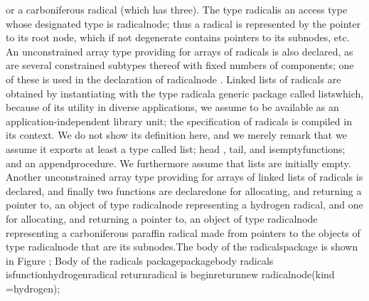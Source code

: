 or a carboniferous radical (which has three). The type %
\tyxffmxmono[]radical\tyxffmxendmono[] is an access type whose designated
type is \tyxffmxmono[]radical\Symuns[]node\tyxffmxendmono[]; thus
a radical is represented by the pointer to its root node, which if
not degenerate contains pointers to its subnodes, etc. An unconstrained
array type providing for arrays of radicals is also declared, as are
several constrained subtypes thereof with fixed numbers of components;
one of these is used in the declaration of \tyxffmxmono[]radical\Symuns[]node%
\tyxffmxendmono[]. Linked lists of radicals are obtained by instantiating
with the type \tyxffmxmono[]radical\tyxffmxendmono[] a generic package
called \tyxffmxmono[]lists\tyxffmxendmono[] which, because of its
utility in diverse applications, we assume to be available as an application-independent
library unit; the specification of \tyxffmxmono[]radicals%
\tyxffmxendmono[] is compiled in its context. We do not show its definition
here, and we merely remark that we assume it exports at least a type
called \tyxffmxmono[]list\tyxffmxendmono[]; \tyxffmxmono[]head%
\tyxffmxendmono[], \tyxffmxmono[]tail\tyxffmxendmono[], and %
\tyxffmxmono[]is\Symuns[]empty\tyxffmxendmono[] functions; and an
\tyxffmxmono[]append\tyxffmxendmono[] procedure. We furthermore assume
that lists are initially empty. Another unconstrained array type providing
for arrays of linked lists of radicals is declared, and finally two
functions are declared\EmDash[]one for allocating, and returning a
pointer to, an object of type \tyxffmxmono[]radical\Symuns[]node%
\tyxffmxendmono[] representing a hydrogen radical, and one for allocating,
and returning a pointer to, an object of type \tyxffmxmono[]radical\Symuns[]node%
\tyxffmxendmono[] representing a carboniferous paraffin radical made
from pointers to the objects of type \tyxffmxmono[]radical\Symuns[]node%
\tyxffmxendmono[] that are its subnodes.\Endpara[]
\Para[]The body of the \tyxffmxmono[]radicals\tyxffmxendmono[] package
is shown in Figure ;
\Parbox[]
Body of the \tyxffmxmono[]radicals%
\tyxffmxendmono[] package\FgEndcap[]
\Comp[]\tyxtstxbf[]package\tyxtstxendbf[] \tyxtstxbf[]body%
\tyxtstxendbf[] radicals \tyxtstxbf[]is\tyxtstxendbf[]
   \tyxtstxbf[]function\tyxtstxendbf[] hydrogen\Symuns[]radical %
\tyxtstxbf[]return\tyxtstxendbf[] radical \tyxtstxbf[]is%
\tyxtstxendbf[]
   \tyxtstxbf[]begin\tyxtstxendbf[]
      \tyxtstxbf[]return\tyxtstxendbf[] \tyxtstxbf[]new%
\tyxtstxendbf[] radical\Symuns[]node\rsquo[](kind =\Symgt[] hydrogen);
